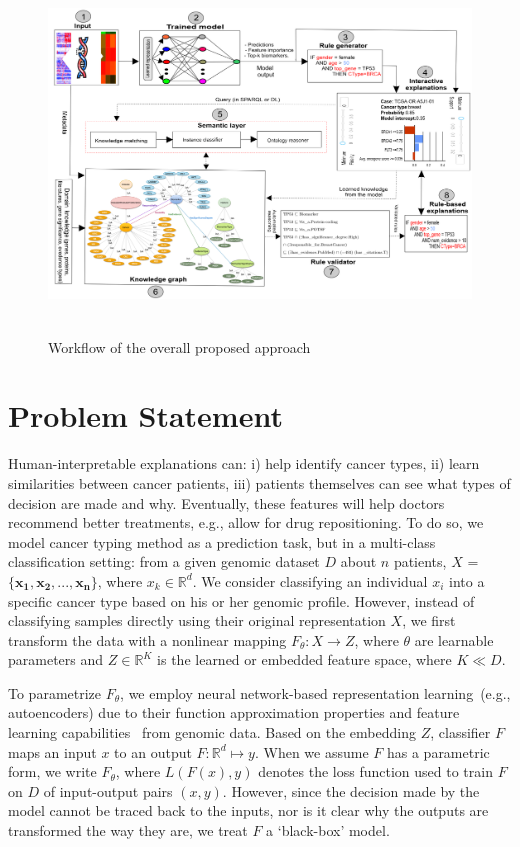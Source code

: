 \begin{figure}[h]
	\centering
	\includegraphics[width=\textwidth,height=95mm]{images/fair_rule_generator.png}	
    \caption{Workflow of the overall proposed approach}
	\label{fig:wf_overall_approach}
\end{figure}

\section{Problem Statement} \label{problem_challenges}
Human-interpretable explanations can: i) help identify cancer types, ii) learn similarities between cancer patients, iii) patients themselves can see what types of decision are made and why. Eventually, these features will help doctors recommend better treatments, e.g., allow for drug repositioning. To do so, we model cancer typing method as a prediction task, but in a multi-class classification setting: from a given genomic dataset $D$ about $n$ patients, $X$ = ${\mathbf{\{x_1,x_2,..., x_n}}\}$, where $x_k \in \mathbb{R}^{d}$. We consider classifying an individual $x_i$ into a specific cancer type based on his or her genomic profile. However, instead of classifying samples directly using their original representation $X$, we first transform the data with a nonlinear mapping $F_{\theta}: X \rightarrow Z$, where $\theta$ are learnable parameters and $Z \in \mathbb{R}^{K}$ is the learned or embedded feature space, where $K \ll D$. 

\hspace*{3.5mm} To parametrize $F_{\theta}$, we employ neural network-based representation learning~(e.g., autoencoders) due to their function approximation properties and feature learning capabilities~\cite{xie2016unsupervised} from genomic data. Based on the embedding $Z$, classifier $F$ maps an input $x$ to an output $F: \mathbb{R}^{d} \mapsto y$. When we assume $F$ has a parametric form, we write $F_{\theta}$, where ${L}(F(x), y)$ denotes the loss function used to train $F$ on $D$ of input-output pairs $(x,y)$. However, since the decision made by the model cannot be traced back to the inputs, nor is it clear why the outputs are transformed the way they are, we treat $F$ a `black-box' model. 

